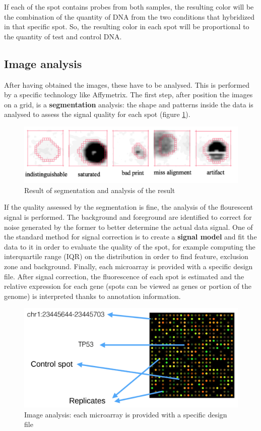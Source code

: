 	If each of the spot contains probes from both samples, the resulting color will be the combination of the quantity of DNA from the two conditions that hybridized in that specific spot.
	So, the resulting color in each spot will be proportional to the quantity of test and control DNA.

	\subsection{Image analysis}
	After having obtained the images, these have to be analysed.
	This is performed by a specific technology like Affymetrix.
	The first step, after position the images on a grid, is a \textbf{segmentation} analysis: the shape and patterns inside the data is analysed to assess the signal quality for each spot (figure \ref{fig:seg}).

	\begin{figure}
	\centering
	\includegraphics[scale=0.3]{segmentation}
	\caption{Result of segmentation and analysis of the result}
	\label{fig:seg}
\end{figure}


	If the quality assessed by the segmentation is fine, the analysis of the flourescent signal is performed.
	The background and foreground are identified to correct for noise generated by the former to better determine the actual data signal.
	One of the standard method for signal correction is to create a \textbf{signal model} and fit the data to it in order to evaluate the quality of the spot, for example computing the interquartile range (IQR) on the distribution in order to find feature, exclusion zone and background.
	Finally, each microarray is provided with a specific design file.
	After signal correction, the fluorescence of each spot is estimated and the relative expression for each gene (spots can be viewed as genes or portion of the genome) is interpreted thanks to annotation information.

	\begin{figure}
	\centering
	\includegraphics[scale=0.2]{design}
	\caption{Image analysis: each microarray is provided with a specific
design file}
	\label{fig:design}
\end{figure}

